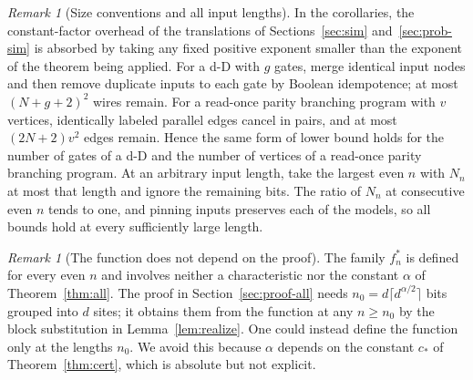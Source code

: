 \documentclass[11pt]{article}
\theoremstyle{remark}
\newtheorem{remark}[theorem]{Remark}
\begin{document}
\begin{remark}[Size conventions and all input lengths]
In the corollaries, the constant-factor overhead of the translations of
Sections~\ref{sec:sim} and~\ref{sec:prob-sim} is absorbed by taking any fixed positive exponent
smaller than the exponent of the theorem being applied. For a d-D with \(g\) gates,
merge identical input nodes and then remove duplicate inputs to each gate
by Boolean idempotence; at most \((N+g+2)^2\) wires remain. For a
read-once parity branching program with \(v\) vertices, identically
labeled parallel edges cancel in pairs, and at most \((2N+2)v^2\) edges
remain. Hence the same form of lower bound holds for the number of gates
of a d-D and the number of vertices of a read-once parity branching
program. At an arbitrary input length, take the largest even \(n\) with
\(N_n\) at most that length and ignore the remaining bits. The ratio of
\(N_n\) at consecutive even \(n\) tends to one, and pinning inputs
preserves each of the models, so all bounds hold at every sufficiently
large length.
\end{remark}

\begin{remark}[The function does not depend on the proof]
The family \(f^*_n\) is defined for every even \(n\) and involves neither
a characteristic nor the constant \(\alpha\) of
Theorem~\ref{thm:all}. The proof in Section~\ref{sec:proof-all} needs
\(n_0=d\lceil d^{\alpha/2}\rceil\) bits grouped into \(d\) sites; it
obtains them from the function at any \(n\ge n_0\) by the block
substitution in Lemma~\ref{lem:realize}. One could instead define the
function only at the lengths \(n_0\). We avoid this because \(\alpha\)
depends on the constant \(c_*\) of Theorem~\ref{thm:cert}, which is
absolute but not explicit.
\end{remark}
\end{document}
